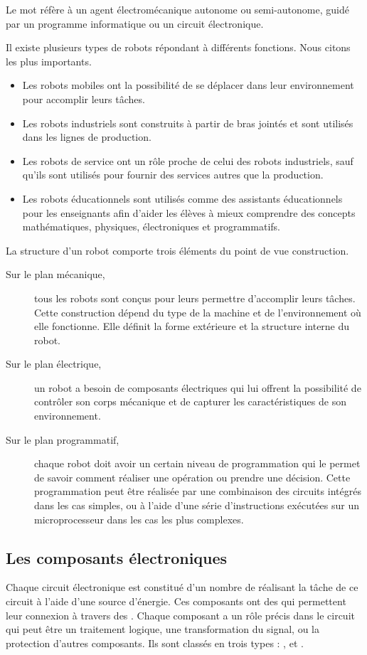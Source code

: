 Le mot  réfère à un agent électromécanique autonome ou
semi-autonome, guidé par un programme informatique ou un circuit électronique.

Il existe plusieurs types de robots répondant à différents fonctions. Nous
citons les plus importants.

\begin{itemize}
  \item Les robots mobiles ont la possibilité de se déplacer dans leur
  environnement pour accomplir leurs tâches.
  \item Les robots industriels sont construits à partir de bras jointés et
  sont utilisés dans les lignes de production.
  \item Les robots de service ont un rôle proche de celui des robots
  industriels, sauf qu'ils sont utilisés pour fournir des services autres que
  la production.
  \item Les robots éducationnels sont utilisés comme des assistants
  éducationnels pour les enseignants afin d'aider les élèves à mieux comprendre
  des concepts mathématiques, physiques, électroniques et programmatifs.
\end{itemize}

La structure d'un robot comporte trois éléments du point de vue construction.

\begin{description}
  \item[Sur le plan mécanique,] tous les robots sont conçus pour leurs
  permettre d'accomplir leurs tâches. Cette construction dépend du type de la
  machine et de l'environnement où elle fonctionne. Elle définit la forme
  extérieure et la structure interne du robot.
  \item[Sur le plan électrique,] un robot a besoin de composants
  électriques qui lui offrent la possibilité de
  contrôler son corps mécanique et de capturer les caractéristiques de son
  environnement.
  \item[Sur le plan programmatif,] chaque robot doit avoir un certain
  niveau de programmation qui le permet de
  savoir comment réaliser une opération ou prendre une décision. Cette
  programmation peut être réalisée par une combinaison des circuits intégrés dans
  les cas simples, ou à l'aide d'une série d'instructions exécutées sur un
  microprocesseur dans les cas les plus complexes.\cite{wikipediaRobotics}
\end{description}

\subsection{Les composants électroniques}
Chaque circuit électronique est constitué d'un nombre de 
réalisant la tâche de ce circuit à l'aide d'une source d'énergie. Ces composants
ont des  qui permettent leur connexion à travers des
. Chaque composant a un rôle précis dans le circuit qui peut être
un traitement logique, une transformation du signal, ou la protection d'autres
composants. Ils sont classés en trois types : ,
 et .\cite{wikipediaElectronicComponent}

